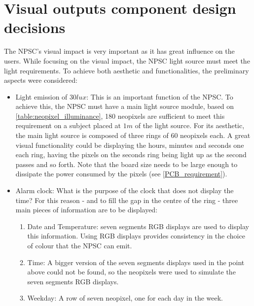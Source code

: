\section{Visual outputs component design decisions}
The NPSC's visual impact is very important as it has great influence on the users. While focusing on the visual impact, the NPSC light source must meet the light requirements. To achieve both aesthetic and functionalities, the preliminary aspects were considered:
\begin{itemize}
\item Light emission of $30lux$: This is an important function of the NPSC. To achieve this, the NPSC must have a main light source module, based on \cref{table:neopixel_illuminance}, 180 neopixels are sufficient to meet this requirement on a subject placed at $1m$ of the light source. For its aesthetic, the main light source is composed of three rings of 60 neopixels each. A great visual functionality could be displaying the hours, minutes and seconds one each ring, having the pixels on the seconds ring being light up as the second passes and so forth. Note that the board size needs to be large enough to dissipate the power consumed by the pixels (see \ref{PCB_requirement}).
\item Alarm clock: What is the purpose of the clock that does not display the time? For this reason - and to fill the gap in the centre of the ring - three main pieces of information are to be displayed:
\begin{enumerate}
\item Date and Temperature:  seven segments RGB displays are used to display this information. Using RGB displays provides consistency in the choice of colour that the NPSC can emit.
\item Time: A bigger version of the seven segments displays used in the point above could not be found, so the neopixels were used to simulate the seven segments RGB displays. 
\item Weekday: A row of seven neopixel, one for each day in the week.
\end{enumerate}
\end{itemize}

